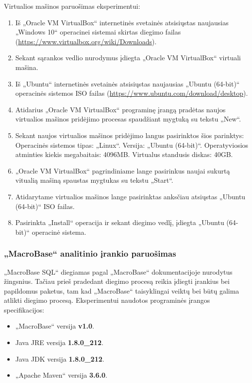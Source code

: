 \documentclass{VUMIFPSbakalaurinis}
\begin{document}
Virtualios mašinos paruošimas eksperimentui:
\begin{enumerate}
	\item Iš „Oracle VM VirtualBox“ internetinės svetainės atsisiųstas naujausias „Windows 10“ operacinei sistemai skirtas diegimo failas (\url{https://www.virtualbox.org/wiki/Downloads}).
	\item Sekant sąrankos vedlio nurodymus įdiegta „Oracle VM VirtualBox“ virtuali mašina.
	\item Iš „Ubuntu“ internetinės svetainės atsisiųstas naujausias „Ubuntu (64-bit)“ operacinės sistemos ISO failas (\url{https://www.ubuntu.com/download/desktop}).
	\item Atidarius „Oracle VM VirtualBox“ programinę įrangą pradėtas naujos virtualios mašinos pridėjimo procesas spaudžiant mygtuką su tekstu „New“.
	\item Sekant naujos virtualios mašinos pridėjimo langus pasirinktos šios parinktys:
		\subitem Operacinės sistemos tipas: „Linux“.
		\subitem Versija: „Ubuntu (64-bit)“.
		\subitem Operatyviosios atminties kiekis megabaitais: 4096MB.
		\subitem Virtualus standusis diskas: 40GB.
	\item „Oracle VM VirtualBox“ pagrindiniame lange pasirinkus naujai sukurtą vitualią mašiną spaustas mygtukas su tekstu „Start“.
	\item Atidarytame virtualios mašinos lange pasirinktas anksčiau atsiųstas „Ubuntu (64-bit)“ ISO failas.
	\item Pasirinkta „Install“ operacija ir sekant diegimo vedlį, įdiegta „Ubuntu (64-bit)“ operacinė sistema.	
\end{enumerate}

\subsubsection{„MacroBase“ analitinio įrankio paruošimas}
„MacroBase SQL“ diegiamas pagal „MacroBase“ dokumentacijoje nurodytus žingsnius. Tačiau prieš pradedant diegimo procesą reikia įdiegti įrankius bei papildomus paketus, tam kad „MacroBase“ taisyklingai veiktų bei būtų galima atlikti diegimo procesą. Eksperimentui naudotos programinės įrangos specifikacijos:
\begin{itemize}
	\item „MacroBase“ versija \textbf{v1.0}.
	\item Java JRE versija \textbf{1.8.0\_212}.
	\item Java JDK versija \textbf{1.8.0\_212}.
	\item „Apache Maven“ versija \textbf{3.6.0}.
\end{itemize}
\end{document}

